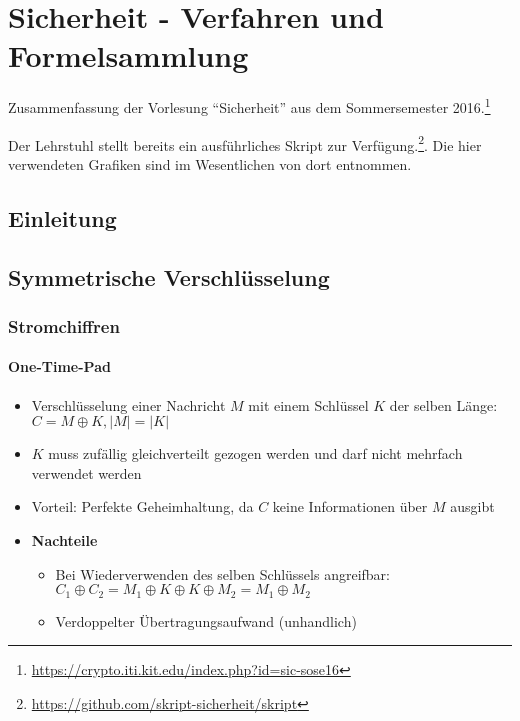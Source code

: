 
\chapter{Sicherheit - Verfahren und Formelsammlung}

Zusammenfassung der Vorlesung "`Sicherheit"' aus dem Sommersemester 2016.\footnote{\url{https://crypto.iti.kit.edu/index.php?id=sic-sose16}}

Der Lehrstuhl stellt bereits ein ausführliches Skript zur Verfügung.\footnote{\url{https://github.com/skript-sicherheit/skript}}. Die hier verwendeten Grafiken sind im Wesentlichen von dort entnommen.

\section{Einleitung}



\section{Symmetrische Verschlüsselung}

\subsection{Stromchiffren}

\subsubsection{One-Time-Pad}
\begin{itemize}
	\item Verschlüsselung einer Nachricht \(M\) mit einem Schlüssel \(K\) der selben Länge: \(C = M \oplus K, |M| = |K|\)
	\item \(K\) muss zufällig gleichverteilt gezogen werden und darf nicht mehrfach verwendet werden
	\item Vorteil: Perfekte Geheimhaltung, da \(C\) keine Informationen über \(M\) ausgibt
	\item \textbf{Nachteile}
	\begin{itemize}
		\item Bei Wiederverwenden des selben Schlüssels angreifbar: \(C_1 \oplus C_2 = M_1 \oplus K \oplus K \oplus M_2 = M_1 \oplus M_2\)
		\item Verdoppelter Übertragungsaufwand (unhandlich)
	\end{itemize}
\end{itemize}


